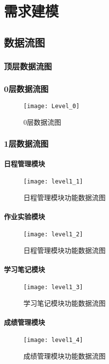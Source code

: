 \chapter{需求建模}
\section{数据流图}
\subsection{顶层数据流图}
\subsection{0层数据流图}
\begin{figure}[H]
\centering
\texttt{[image: Level\_0]}
\caption{0层数据流图}
\end{figure}
\subsection{1层数据流图}
\subsubsection{日程管理模块}
\begin{figure}[H]
\centering
\texttt{[image: level1\_1]}
\caption{日程管理模块功能数据流图}
\end{figure}
\subsubsection{作业实验模块}
\begin{figure}[H]
\centering
\texttt{[image: level1\_2]}
\caption{日程管理模块功能数据流图}
\end{figure}
\subsubsection{学习笔记模块}
\begin{figure}[H]
\centering
\texttt{[image: level1\_3]}
\caption{学习笔记模块功能数据流图}
\end{figure}
\subsubsection{成绩管理模块}
\begin{figure}[H]
\centering
\texttt{[image: level1\_4]}
\caption{成绩管理模块功能数据流图}
\end{figure}
